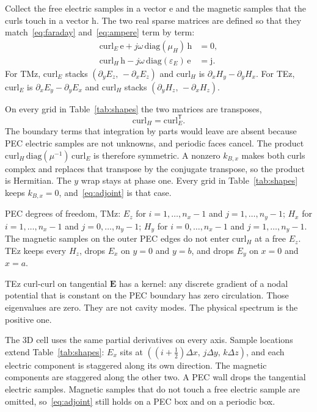\documentclass[11pt,a4paper]{article}
\numberwithin{equation}{section}
\begin{document}
Collect the free electric samples in a vector $\mathrm{e}$ and the magnetic
samples that the curls touch in a vector $\mathrm{h}$. The two real sparse
matrices are defined so that they match~\eqref{eq:faraday} and~\eqref{eq:ampere}
term by term:
\begin{align}
\mathrm{curl}_E\,\mathrm{e} + j\omega\,\mathrm{diag}(\mu_H)\,\mathrm{h} &= 0,
\label{eq:curl-e}\\
\mathrm{curl}_H\,\mathrm{h} - j\omega\,\mathrm{diag}(\varepsilon_E)\,\mathrm{e}
&= \mathrm{j}.
\label{eq:curl-h}
\end{align}
For TMz, $\mathrm{curl}_E$ stacks $(\partial_y E_z,\,-\partial_x E_z)$ and
$\mathrm{curl}_H$ is $\partial_x H_y-\partial_y H_x$. For TEz,
$\mathrm{curl}_E$ is $\partial_x E_y-\partial_y E_x$ and $\mathrm{curl}_H$
stacks $(\partial_y H_z,\,-\partial_x H_z)$.

On every grid in Table~\ref{tab:shapes} the two matrices are transposes,
\begin{equation}
\mathrm{curl}_H = \mathrm{curl}_E^{\mathsf T}.
\label{eq:adjoint}
\end{equation}
The boundary terms that integration by parts would leave are absent because
PEC electric samples are not unknowns, and periodic faces cancel. The product
$\mathrm{curl}_H\,\mathrm{diag}(\mu^{-1})\,\mathrm{curl}_E$ is therefore
symmetric. A nonzero $k_{B,x}$ makes both curls complex and replaces that
transpose by the conjugate transpose, so the product is Hermitian. The $y$
wrap stays at phase one. Every grid in Table~\ref{tab:shapes} keeps
$k_{B,x}=0$, and~\eqref{eq:adjoint} is that case.

PEC degrees of freedom, TMz:
$E_z$ for $i=1,\ldots,n_x-1$ and $j=1,\ldots,n_y-1$;
$H_x$ for $i=1,\ldots,n_x-1$ and $j=0,\ldots,n_y-1$;
$H_y$ for $i=0,\ldots,n_x-1$ and $j=1,\ldots,n_y-1$.
The magnetic samples on the outer PEC edges do not enter $\mathrm{curl}_H$ at
a free $E_z$. TEz keeps every $H_z$, drops $E_x$ on $y=0$ and $y=b$, and drops
$E_y$ on $x=0$ and $x=a$.

TEz curl-curl on tangential $\mathbf{E}$ has a kernel: any discrete gradient of
a nodal potential that is constant on the PEC boundary has zero circulation.
Those eigenvalues are zero. They are not cavity modes. The physical spectrum
is the positive one.

The 3D cell uses the same partial derivatives on every axis. Sample
locations extend Table~\ref{tab:shapes}: $E_x$ sits at
$((i+\tfrac12)\Delta x,\, j\Delta y,\, k\Delta z)$, and each electric
component is staggered along its own direction. The magnetic components
are staggered along the other two. A PEC wall drops the tangential
electric samples. Magnetic samples that do not touch a free electric
sample are omitted, so~\eqref{eq:adjoint} still holds on a PEC box and on
a periodic box.
\end{document}
